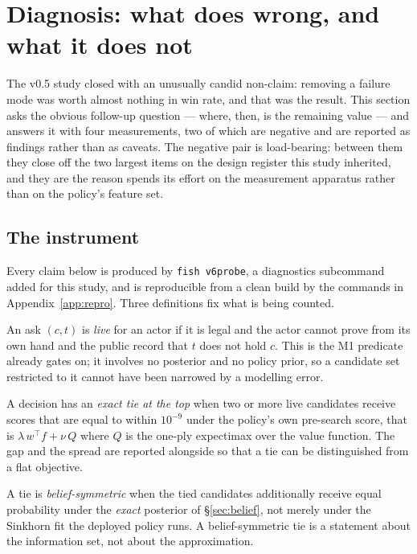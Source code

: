 \section{Diagnosis: what \vfive{} does wrong, and what it does not}
\label{sec:diagnosis}

The v0.5 study closed with an unusually candid non-claim: removing a failure mode was worth almost
nothing in win rate, and that was the result. This section asks the obvious follow-up question ---
where, then, is the remaining value --- and answers it with four measurements, two of which are
negative and are reported as findings rather than as caveats. The negative pair is load-bearing:
between them they close off the two largest items on the design register this study inherited, and
they are the reason \vsix{} spends its effort on the measurement apparatus rather than on the
policy's feature set.

\subsection{The instrument}
\label{sec:diag-instrument}

Every claim below is produced by \texttt{fish v6probe}, a diagnostics subcommand added for this
study, and is reproducible from a clean build by the commands in Appendix~\ref{app:repro}. Three
definitions fix what is being counted.

\begin{definition}
An ask $(c,t)$ is \emph{live} for an actor if it is legal and the actor cannot prove from its own
hand and the public record that $t$ does not hold $c$. This is the M1 predicate \vfive{} already
gates on; it involves no posterior and no policy prior, so a candidate set restricted to it cannot
have been narrowed by a modelling error.
\end{definition}

\begin{definition}
A decision has an \emph{exact tie at the top} when two or more live candidates receive scores that
are equal to within $10^{-9}$ under the policy's own pre-search score, that is
$\lambda\, w^{\!\top}\! f + \nu\, Q$ where $Q$ is the one-ply expectimax over the value function.
The gap and the spread are reported alongside so that a tie can be distinguished from a flat
objective.
\end{definition}

\begin{definition}
A tie is \emph{belief-symmetric} when the tied candidates additionally receive equal probability
under the \emph{exact} posterior of \S\ref{sec:belief}, not merely under the Sinkhorn fit the
deployed policy runs. A belief-symmetric tie is a statement about the information set, not about
the approximation.
\end{definition}

